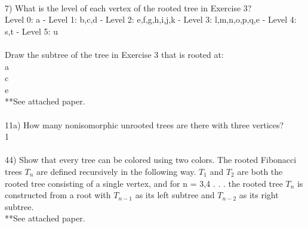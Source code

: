 \documentclass{article}
\begin{document}
\begin{flushleft}
~\\
\setlength\parindent{0pt}7) What is the level of each vertex of the rooted tree in Exercise 3? \\
\setlength\parindent{24pt} Level 0: a - Level 1: b,c,d - Level 2: e,f,g,h,i,j,k - Level 3: l,m,n,o,p,q,e - Level 4: s,t - Level 5: u \\
~\\
\setlength\parindent{0pt} Draw the subtree of the tree in Exercise 3 that is rooted at: \\
\setlength\parindent{24pt} a \\
\setlength\parindent{24pt} c \\
\setlength\parindent{24pt} e \\
**See attached paper. \\
~\\
\setlength\parindent{0pt}11a) How many nonisomorphic unrooted trees are there with three vertices? \\
\setlength\parindent{24pt} 1 \\
~\\
\setlength\parindent{0pt}44) Show that every tree can be colored using two colors.  The rooted Fibonacci trees $T_n$ are defined recursively in the following way.  $T_1$ and $T_2$ are both the rooted tree consisting of a single vertex, and for n = 3,4 . . . the rooted tree $T_n$ is constructed from a root with $T_{n-1}$ as its left subtree and $T_{n-2}$ as its right subtree. \\
**See attached paper.

\end{flushleft}
\end{document}
